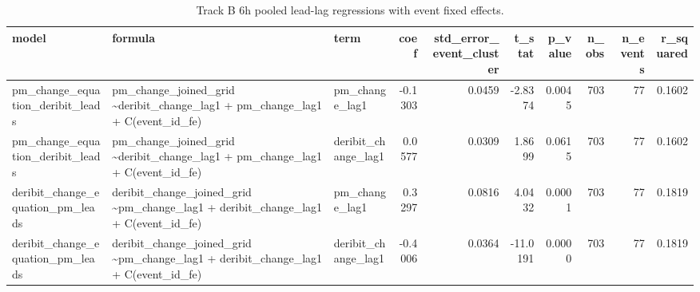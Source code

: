 \begin{table}
\caption{Track B 6h pooled lead-lag regressions with event fixed effects.}
\label{tab:trackB_pooled_lead_lag_6h}
\begin{tabular}{lllrrrrrrr}
\toprule
model & formula & term & coef & std\_error\_event\_cluster & t\_stat & p\_value & n\_obs & n\_events & r\_squared \\
\midrule
pm\_change\_equation\_deribit\_leads & pm\_change\_joined\_grid \textasciitilde \space deribit\_change\_lag1 + pm\_change\_lag1 + C(event\_id\_fe) & pm\_change\_lag1 & -0.1303 & 0.0459 & -2.8374 & 0.0045 & 703 & 77 & 0.1602 \\
pm\_change\_equation\_deribit\_leads & pm\_change\_joined\_grid \textasciitilde \space deribit\_change\_lag1 + pm\_change\_lag1 + C(event\_id\_fe) & deribit\_change\_lag1 & 0.0577 & 0.0309 & 1.8699 & 0.0615 & 703 & 77 & 0.1602 \\
deribit\_change\_equation\_pm\_leads & deribit\_change\_joined\_grid \textasciitilde \space pm\_change\_lag1 + deribit\_change\_lag1 + C(event\_id\_fe) & pm\_change\_lag1 & 0.3297 & 0.0816 & 4.0432 & 0.0001 & 703 & 77 & 0.1819 \\
deribit\_change\_equation\_pm\_leads & deribit\_change\_joined\_grid \textasciitilde \space pm\_change\_lag1 + deribit\_change\_lag1 + C(event\_id\_fe) & deribit\_change\_lag1 & -0.4006 & 0.0364 & -11.0191 & 0.0000 & 703 & 77 & 0.1819 \\
\bottomrule
\end{tabular}
\end{table}
